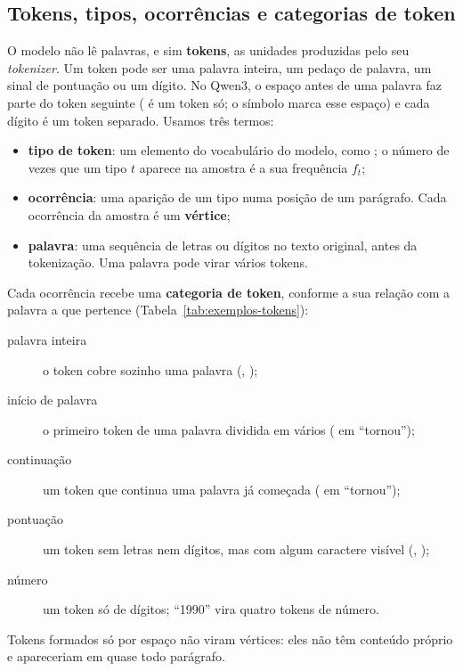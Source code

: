 \subsection{Tokens, tipos, ocorrências e categorias de token}\label{sec:tokens}

O modelo não lê palavras, e sim \textbf{tokens}, as unidades produzidas pelo seu
\emph{tokenizer}. Um token pode ser uma palavra inteira, um pedaço de palavra, um sinal de
pontuação ou um dígito. No Qwen3, o espaço antes de uma palavra faz parte do token seguinte
( é um token só; o símbolo \esp{} marca esse espaço) e cada dígito é um token
separado. Usamos três termos:
\begin{itemize}
    \item \textbf{tipo de token}: um elemento do vocabulário do modelo, como ;
    o número de vezes que um tipo $t$ aparece na amostra é a sua frequência $f_t$;
    \item \textbf{ocorrência}: uma aparição de um tipo numa posição de um parágrafo. Cada
    ocorrência da amostra é um \textbf{vértice};
    \item \textbf{palavra}: uma sequência de letras ou dígitos no texto original, antes da
    tokenização. Uma palavra pode virar vários tokens.
\end{itemize}

Cada ocorrência recebe uma \textbf{categoria de token}, conforme a sua relação com a palavra a
que pertence (Tabela~\ref{tab:exemplos-tokens}):
\begin{description}
    \item[palavra inteira] o token cobre sozinho uma palavra (,
    );
    \item[início de palavra] o primeiro token de uma palavra dividida em vários
    ( em ``tornou'');
    \item[continuação] um token que continua uma palavra já começada ( em
    ``tornou'');
    \item[pontuação] um token sem letras nem dígitos, mas com algum caractere visível
    (\tok{,}, \tok{\esp(});
    \item[número] um token só de dígitos; ``1990'' vira quatro tokens de número.
\end{description}
Tokens formados só por espaço não viram vértices: eles não têm conteúdo próprio e
apareceriam em quase todo parágrafo.

